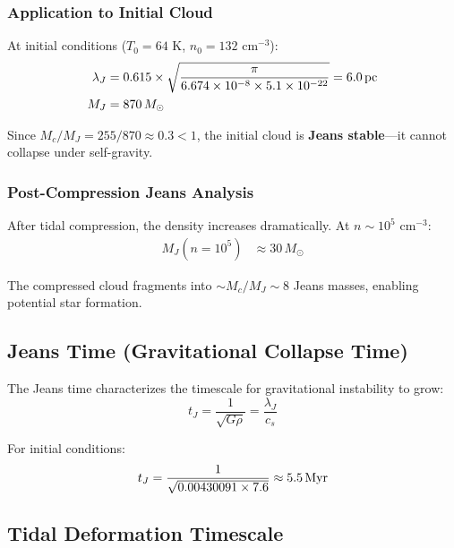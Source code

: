 \documentclass[twocolumn,amsmath,amssymb,prd,superscriptaddress,nofootinbib]{revtex4-2}
\begin{document}
\subsubsection{Application to Initial Cloud}

At initial conditions ($T_0 = 64$ K, $n_0 = 132$ cm$^{-3}$):
\begin{align}
    \lambda_J &= 0.615 \times \sqrt{\frac{\pi}{6.674 \times 10^{-8} \times 5.1 \times 10^{-22}}} = 6.0\,{\rm pc} \\
    M_J &= 870\,M_\odot
\end{align}

Since $M_c/M_J = 255/870 \approx 0.3 < 1$, the initial cloud is \textbf{Jeans stable}---it cannot collapse under self-gravity.

\subsubsection{Post-Compression Jeans Analysis}

After tidal compression, the density increases dramatically. At $n \sim 10^5$ cm$^{-3}$:
\begin{align}
    M_J(n = 10^5) &\approx 30\,M_\odot
\end{align}

The compressed cloud fragments into $\sim M_c/M_J \sim 8$ Jeans masses, enabling potential star formation.

\subsection{Jeans Time (Gravitational Collapse Time)}
\label{sec:t_jeans}

The Jeans time characterizes the timescale for gravitational instability to grow:
\begin{equation}
    t_J = \frac{1}{\sqrt{G\rho}} = \frac{\lambda_J}{c_s}
    \label{eq:t_jeans}
\end{equation}

For initial conditions:
\begin{equation}
    t_J = \frac{1}{\sqrt{0.00430091 \times 7.6}} \approx 5.5\,{\rm Myr}
\end{equation}

\subsection{Tidal Deformation Timescale}
\label{sec:t_tidal}
\end{document}
